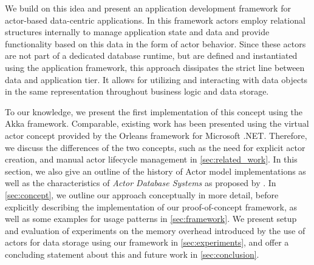   We build on this idea and present an application development framework for actor-based data-centric applications.
  In this framework actors employ relational structures internally to manage application state and data
  and provide functionality based on this data in the form of actor behavior.
  Since these actors are not part of a dedicated database runtime, but are defined and instantiated using the application framework, this approach dissipates the strict line between data and application tier.
  It allows for utilizing and interacting with data objects in the same representation throughout business logic and data storage.

  To our knowledge, we present the first implementation of this concept using the Akka framework.
  Comparable, existing work has been presented using the virtual actor concept provided by the Orleans framework for Microsoft .NET.
  Therefore, we discuss the differences of the two concepts, such as the need for explicit actor creation, and manual actor lifecycle management in \cref{sec:related_work}.
  In this section, we also give an outline of the history of Actor model implementations as well as the characteristics of \textit{Actor Database Systems} as proposed by \citeauthor{manifesto}.
  In \cref{sec:concept}, we outline our approach conceptually in more detail,
  before explicitly describing the implementation of our proof-of-concept framework, as well as some examples for usage patterns in \cref{sec:framework}.
  We present setup and evaluation of experiments on the memory overhead introduced by the use of actors for data storage using our framework in \cref{sec:experiments},
  and offer a concluding statement about this and future work in \cref{sec:conclusion}.
  
